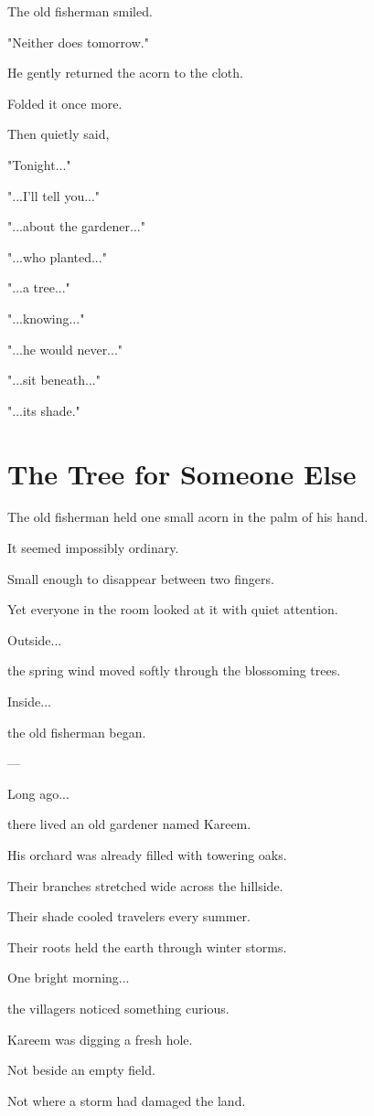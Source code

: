 \documentclass[12pt,openany]{book}
\begin{document}
The old fisherman smiled.

"Neither does tomorrow."

He gently returned the acorn to the cloth.

Folded it once more.

Then quietly said,

"Tonight..."

"...I'll tell you..."

"...about the gardener..."

"...who planted..."

"...a tree..."

"...knowing..."

"...he would never..."

"...sit beneath..."

"...its shade."
\section*{The Tree for Someone Else}

The old fisherman held one small acorn in the palm of his hand.

It seemed impossibly ordinary.

Small enough to disappear between two fingers.

Yet everyone in the room looked at it with quiet attention.

Outside...

the spring wind moved softly through the blossoming trees.

Inside...

the old fisherman began.

---

Long ago...

there lived an old gardener named Kareem.

His orchard was already filled with towering oaks.

Their branches stretched wide across the hillside.

Their shade cooled travelers every summer.

Their roots held the earth through winter storms.

One bright morning...

the villagers noticed something curious.

Kareem was digging a fresh hole.

Not beside an empty field.

Not where a storm had damaged the land.
\end{document}
